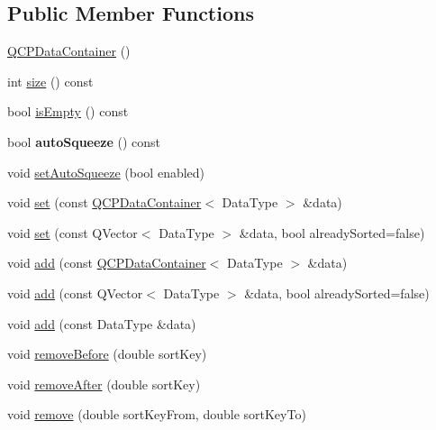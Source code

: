 \subsection*{Public Member Functions}
\begin{DoxyCompactItemize}
\item 
\mbox{\hyperlink{class_q_c_p_data_container_af86c0c63719f92c360ff67cc06c6fe6f}{Q\+C\+P\+Data\+Container}} ()
\item 
int \mbox{\hyperlink{class_q_c_p_data_container_a8e9b262c739672e13472d0d45b720258}{size}} () const
\item 
bool \mbox{\hyperlink{class_q_c_p_data_container_a7bdebfccd2f9f84bf032882f9d6b00a8}{is\+Empty}} () const
\item 
\mbox{\label{class_q_c_p_data_container_a64f0f1621ca46de2352eaf87476db9b1}} 
bool {\bfseries auto\+Squeeze} () const
\item 
void \mbox{\hyperlink{class_q_c_p_data_container_a233f866760a78950d2a393c1a4bc54b5}{set\+Auto\+Squeeze}} (bool enabled)
\item 
void \mbox{\hyperlink{class_q_c_p_data_container_ae7042bd534fc3ce7befa2ce3f790b5bf}{set}} (const \mbox{\hyperlink{class_q_c_p_data_container}{Q\+C\+P\+Data\+Container}}$<$ Data\+Type $>$ \&data)
\item 
void \mbox{\hyperlink{class_q_c_p_data_container_aff99fffbb26597a354c4bc8312596ab2}{set}} (const Q\+Vector$<$ Data\+Type $>$ \&data, bool already\+Sorted=false)
\item 
void \mbox{\hyperlink{class_q_c_p_data_container_a42b98bd994307ccd163a43d576f91ad9}{add}} (const \mbox{\hyperlink{class_q_c_p_data_container}{Q\+C\+P\+Data\+Container}}$<$ Data\+Type $>$ \&data)
\item 
void \mbox{\hyperlink{class_q_c_p_data_container_a51d2a4c9ce4baf5e950b767d26673972}{add}} (const Q\+Vector$<$ Data\+Type $>$ \&data, bool already\+Sorted=false)
\item 
void \mbox{\hyperlink{class_q_c_p_data_container_a715e8e9972466804954a2f8fbd5288b7}{add}} (const Data\+Type \&data)
\item 
void \mbox{\hyperlink{class_q_c_p_data_container_aa7f74cbce304b0369e1626c3798e1eda}{remove\+Before}} (double sort\+Key)
\item 
void \mbox{\hyperlink{class_q_c_p_data_container_abbe5d87ffc10b5aeffa5bb42cf03aa3c}{remove\+After}} (double sort\+Key)
\item 
void \mbox{\hyperlink{class_q_c_p_data_container_ae5f569a120648b167efa78835f12fd38}{remove}} (double sort\+Key\+From, double sort\+Key\+To)

\end{DoxyCompactItemize}
